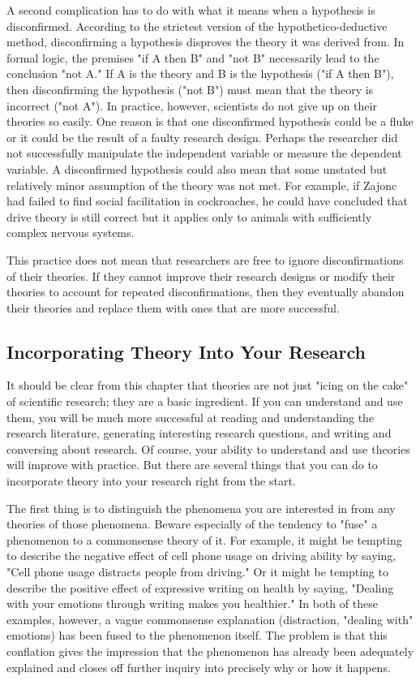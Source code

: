 A second complication has to do with what it means when a hypothesis is disconfirmed. According to the strictest version of the hypothetico-deductive method, disconfirming a hypothesis disproves the theory it was derived from. In formal logic, the premises "if A then B" and "not B" necessarily lead to the conclusion "not A." If A is the theory and B is the hypothesis ("if A then B"), then disconfirming the hypothesis ("not B") must mean that the theory is incorrect ("not A"). In practice, however, scientists do not give up on their theories so easily. One reason is that one disconfirmed hypothesis could be a fluke or it could be the result of a faulty research design. Perhaps the researcher did not successfully manipulate the independent variable or measure the dependent variable. A disconfirmed hypothesis could also mean that some unstated but relatively minor assumption of the theory was not met. For example, if Zajonc had failed to find social facilitation in cockroaches, he could have concluded that drive theory is still correct but it applies only to animals with sufficiently complex nervous systems.


This practice does not mean that researchers are free to ignore disconfirmations of their theories. If they cannot improve their research designs or modify their theories to account for repeated disconfirmations, then they eventually abandon their theories and replace them with ones that are more successful.


\subsection{Incorporating Theory Into Your Research}


It should be clear from this chapter that theories are not just "icing on the cake" of scientific research; they are a basic ingredient. If you can understand and use them, you will be much more successful at reading and understanding the research literature, generating interesting research questions, and writing and conversing about research. Of course, your ability to understand and use theories will improve with practice. But there are several things that you can do to incorporate theory into your research right from the start.


The first thing is to distinguish the phenomena you are interested in from any theories of those phenomena. Beware especially of the tendency to "fuse" a phenomenon to a commonsense theory of it. For example, it might be tempting to describe the negative effect of cell phone usage on driving ability by saying, "Cell phone usage distracts people from driving." Or it might be tempting to describe the positive effect of expressive writing on health by saying, "Dealing with your emotions through writing makes you healthier." In both of these examples, however, a vague commonsense explanation (distraction, "dealing with" emotions) has been fused to the phenomenon itself. The problem is that this conflation gives the impression that the phenomenon has already been adequately explained and closes off further inquiry into precisely why or how it happens.



